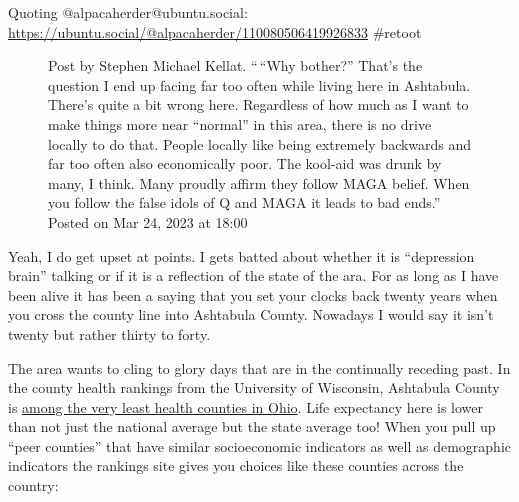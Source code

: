 Quoting @alpacaherder@ubuntu.social:
\url{https://ubuntu.social/@alpacaherder/110080506419926833} \#retoot

\begin{figure}
\centering
{}
\caption{Post by Stephen Michael Kellat. ``\,``Why bother?'' That's the
question I end up facing far too often while living here in Ashtabula.
There's quite a bit wrong here. Regardless of how much as I want to make
things more near ``normal'' in this area, there is no drive locally to
do that. People locally like being extremely backwards and far too often
also economically poor. The kool-aid was drunk by many, I think. Many
proudly affirm they follow MAGA belief. When you follow the false idols
of Q and MAGA it leads to bad ends.'' Posted on Mar 24, 2023 at 18:00}
\end{figure}

Yeah, I do get upset at points. I gets batted about whether it is
``depression brain'' talking or if it is a reflection of the state of
the ara. For as long as I have been alive it has been a saying that you
set your clocks back twenty years when you cross the county line into
Ashtabula County. Nowadays I would say it isn't twenty but rather thirty
to forty.

The area wants to cling to glory days that are in the continually
receding past. In the county health rankings from the University of
Wisconsin, Ashtabula County is
\href{https://www.countyhealthrankings.org/explore-health-rankings/ohio/ashtabula?year=2022}{among
the very least health counties in Ohio}. Life expectancy here is lower
than not just the national average but the state average too! When you
pull up ``peer counties'' that have similar socioeconomic indicators as
well as demographic indicators the rankings site gives you choices like
these counties across the country:

